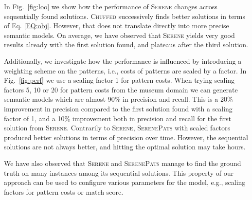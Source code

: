 \documentclass[letterpaper]{article} %
\newcommand{\chuffed}{\textsc{Chuffed}}
\newcommand{\serene}{\textsc{Serene}}
\newcommand{\serenepats}{\textsc{SerenePats}}
\begin{document}
In Fig.~\ref{fig:loo} we show how the performance of \serene{} changes 
across sequentially found solutions.
\chuffed{} successively finds better solutions in terms of Eq. \ref{EQ:obj}.
However,
that does not translate directly into more precise semantic models.
On average, we have observed that \serene{} yields very good results already 
with the first solution found, and plateaus after the third solution.

Additionally, we investigate how the performance is influenced by introducing 
a weighting scheme on the patterns, i.e., costs of patterns are scaled by a 
factor.
In Fig.~\ref{fig:perf} we use a scaling factor 1 
for pattern costs.
When trying scaling factors 5, 10 or 20 for pattern costs from the museum 
domain we can generate semantic models which 
are almost 90\% in precision and recall.
This is a 20\% improvement in precision compared to the first solution found 
with a scaling factor of 1, and a 10\% improvement both in precision and recall 
for the first solution from \serene{}.
Contrarily to \serene{}, \serenepats{} with scaled factors produced better 
solutions in terms of precision over time.
However, the sequential solutions are not always better, and hitting the 
optimal solution may take hours.

We have also observed that \serene{} and \serenepats{} manage to find the ground truth on 
many instances among its sequential solutions.
This property of our approach can be used to configure various parameters for the model, e.g., scaling factors for pattern costs or match score.


\end{document}
